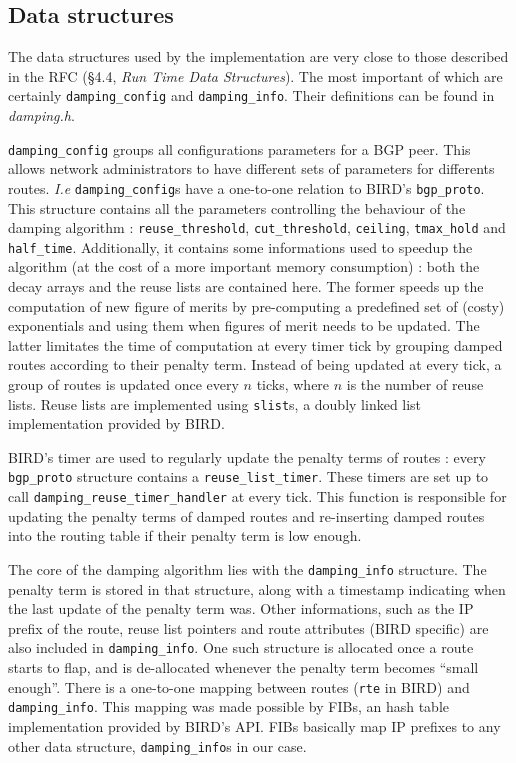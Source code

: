 \documentclass[a4paper,english]{IEEEtran}
\begin{document}
\subsection{Data structures}

The data structures used by the implementation are very close to those described 
in the RFC (\S4.4, \textit{Run Time Data Structures}).
The most important of which are certainly {\tt\small damping\_config} and
{\tt\small damping\_info}.
Their definitions can be found in {\sl damping.h}.

{\tt\small damping\_config} groups all configurations parameters for a BGP peer.
This allows network administrators to have different sets of parameters for
differents routes. {\it I.e} \texttt{\small damping\_config}s have a one-to-one relation
to BIRD's \texttt{\small bgp\_proto}.
This structure contains all the parameters controlling the behaviour of the damping algorithm :
\texttt{\small reuse\_threshold}, \texttt{\small cut\_threshold}, 
\texttt{\small ceiling}, \texttt{\small tmax\_hold} and \texttt{\small half\_time}.
Additionally, it contains some informations used to speedup the algorithm (at the cost of a more
important memory consumption) : both the decay arrays and the reuse lists are contained here.
The former speeds up the computation of new figure of merits by pre-computing a predefined set
of (costy) exponentials and using them when figures of merit needs to be updated.
The latter limitates the time of computation at every timer tick by grouping damped routes
according to their penalty term.
Instead of being updated at every tick, a group of routes is updated once every $n$ ticks, 
where $n$ is the number of reuse lists.
Reuse lists are implemented using \texttt{\small slist}s, a doubly linked list implementation provided by BIRD.

BIRD's timer are used to regularly update the penalty terms of routes : every \texttt{\small bgp\_proto} structure
contains a \texttt{\small reuse\_list\_timer}.
These timers are set up to call \texttt{\small damping\_reuse\_timer\_handler} at every tick.
This function is responsible for updating the penalty terms of damped routes and re-inserting damped routes
into the routing table if their penalty term is low enough.

The core of the damping algorithm lies with the \texttt{\small damping\_info} structure.
The penalty term is stored in that structure, along with a timestamp indicating when the last
update of the penalty term was.
Other informations, such as the IP prefix of the route, reuse list pointers and route attributes (BIRD specific) are also included
in \texttt{\small damping\_info}.
One such structure is allocated once a route starts to flap, and is de-allocated whenever the penalty term becomes ``small enough''.
There is a one-to-one mapping between routes (\texttt{\small rte} in BIRD) and \texttt{\small damping\_info}.
This mapping was made possible by FIBs, an hash table implementation provided by BIRD's API.
FIBs basically map IP prefixes to any other data structure, {\tt\small damping\_info}s in our case.
\end{document}

